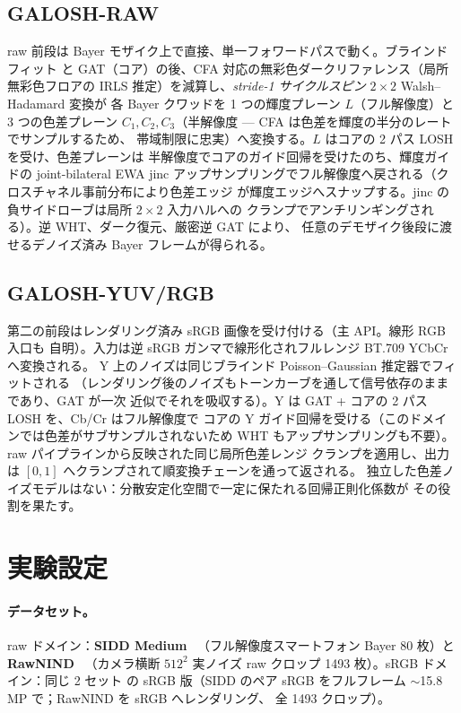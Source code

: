 \documentclass[10pt,twocolumn]{article}
\begin{document}
\subsection{GALOSH-RAW}\label{sec:raw}
raw 前段は Bayer モザイク上で直接、単一フォワードパスで動く。ブラインドフィット
と GAT（コア）の後、CFA 対応の無彩色ダークリファレンス（局所無彩色フロアの IRLS
推定）を減算し、\emph{stride-1 サイクルスピン} $2{\times}2$ Walsh--Hadamard 変換が
各 Bayer クワッドを 1 つの輝度プレーン $L$（フル解像度）と 3 つの色差プレーン
$C_1,C_2,C_3$（半解像度 --- CFA は色差を輝度の半分のレートでサンプルするため、
帯域制限に忠実）へ変換する。$L$ はコアの 2 パス LOSH を受け、色差プレーンは
半解像度でコアのガイド回帰を受けたのち、輝度ガイドの joint-bilateral EWA jinc
アップサンプリングでフル解像度へ戻される（クロスチャネル事前分布により色差エッジ
が輝度エッジへスナップする。jinc の負サイドローブは局所 $2{\times}2$ 入力ハルへの
クランプでアンチリンギングされる）。逆 WHT、ダーク復元、厳密逆 GAT により、
任意のデモザイク後段に渡せるデノイズ済み Bayer フレームが得られる。

\subsection{GALOSH-YUV/RGB}\label{sec:yuv}
第二の前段はレンダリング済み sRGB 画像を受け付ける（主 API。線形 RGB 入口も
自明）。入力は逆 sRGB ガンマで線形化されフルレンジ BT.709 YCbCr へ変換される。
Y 上のノイズは同じブラインド Poisson--Gaussian 推定器でフィットされる
（レンダリング後のノイズもトーンカーブを通して信号依存のままであり、GAT が一次
近似でそれを吸収する）。Y は GAT + コアの 2 パス LOSH を、Cb/Cr はフル解像度で
コアの Y ガイド回帰を受ける（このドメインでは色差がサブサンプルされないため WHT
もアップサンプリングも不要）。raw パイプラインから反映された同じ局所色差レンジ
クランプを適用し、出力は $[0,1]$ へクランプされて順変換チェーンを通って返される。
独立した色差ノイズモデルはない：分散安定化空間で一定に保たれる回帰正則化係数が
その役割を果たす。

\section{実験設定}\label{sec:exp}
\paragraph{データセット。} raw ドメイン：\textbf{SIDD Medium}~\cite{sidd}
（フル解像度スマートフォン Bayer 80 枚）と \textbf{RawNIND}~\cite{rawnind}
（カメラ横断 $512^2$ 実ノイズ raw クロップ 1493 枚）。sRGB ドメイン：同じ 2 セット
の sRGB 版（SIDD のペア sRGB をフルフレーム $\sim$15.8\,MP で；RawNIND を sRGB へレンダリング、
全 1493 クロップ）。
\end{document}
